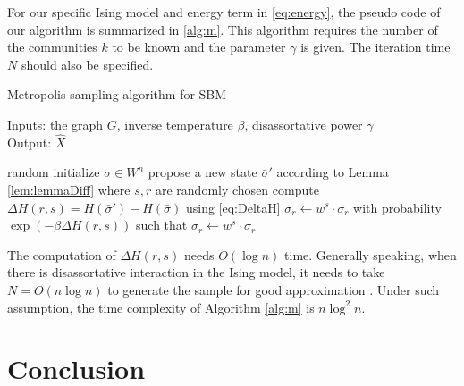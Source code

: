 \documentclass[journal]{IEEEtran}
\newcommand{\1}{\mathbbm{1}}
\begin{document}
For our specific Ising model and energy term in \eqref{eq:energy},
the pseudo code of our algorithm is summarized in \ref{alg:m}.
This algorithm requires the number of the communities $k$ to be known and the parameter $\gamma$ is given.
The iteration time $N$ should also be specified.
\begin{algorithm}[H]
	\caption{Metropolis sampling algorithm for SBM} \label{alg:m}
	Inputs: the graph $G$, inverse temperature $\beta$, disassortative power $\gamma$ \\
	Output: $\hat{X}$
	\begin{algorithmic}[1]
		\STATE random initialize $\sigma \in W^n$
		\STATE propose a new state $\bar{\sigma}'$ according to Lemma \ref{lem:lemmaDiff} where $s, r$ are randomly chosen
		\STATE compute $\Delta H(r,s) = H(\bar{\sigma}') - H(\bar{\sigma})$ using \eqref{eq:DeltaH}
		\STATE $\sigma_r \leftarrow w^s \cdot \sigma_r$
		\ELSE
		\STATE with probability $\exp(-\beta \Delta H(r,s))$
			such that $\sigma_r \leftarrow w^s \cdot \sigma_r$
		\ENDIF
		\ENDFOR
	\end{algorithmic}
\end{algorithm}
The computation of $\Delta H(r,s)$ needs $O(\log n)$ time. Generally speaking, when there is disassortative interaction in
the Ising model, it needs to take $N=O(n\log n)$ to generate the sample for good approximation \cite{mcmc}.
Under such assumption, the time complexity of Algorithm \ref{alg:m} is $n \log^2 n$.

\section{Conclusion}


\appendix
\end{document}
